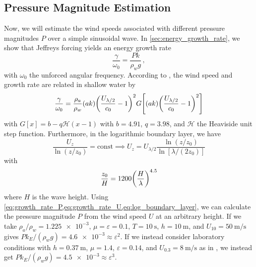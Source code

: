 \documentclass{jfm}
\renewcommand*{\epsilon}{\varepsilon}
\begin{document}
\subsection{\label{sec:press_mag} Pressure Magnitude Estimation}
Now, we will estimate the wind speeds associated with different pressure
magnitudes $P$ over a simple sinusoidal wave.
In \cref{sec:energy_growth_rate}, we show that Jeffreys forcing yields
an energy growth rate
\begin{equation}
  \frac{\gamma}{\omega_0} = \frac{P k}{\rho_w g} \,,
  \label{eq:growth_rate_P}
\end{equation}
with $\omega_0$ the unforced angular frequency.
According to \citet{donelan2006wave}, the wind speed and growth rate
are related in shallow water by
\begin{equation}
  \frac{\gamma}{\omega_0} = \frac{\rho_a}{\rho_w} (ak)
  \pqty{\frac{U_{\lambda/2}}{c_0} - 1}^2
  G \bqty{(ak)
  \pqty{\frac{U_{\lambda/2}}{c_0} - 1}^2}
  \label{eq:growth_rate_U}
\end{equation}
with $G[x] = b - q \mathcal{H}(x - 1)$ with $b = 4.91$, $q = 3.98$, and
$\mathcal{H}$ the Heaviside unit step function.
Furthermore, in the logarithmic boundary layer, we have
\begin{equation}
  \frac{U_z}{\ln(z/z_0)} = \text{const}
  \implies U_{z} = U_{\lambda/2} \frac{\ln(z/z_0)}{\ln[\lambda/(2 z_0)]}
  \label{eq:log_boundary_layer}
\end{equation}
with \citep{taylor2001dependence}
\begin{equation}
  \frac{z_0}{H} = 1200 \pqty{\frac{H}{\lambda}}^{4.5}
\end{equation}
where $H$ is the wave height.
Using \cref{eq:growth_rate_P,eq:growth_rate_U,eq:log_boundary_layer}, we
can calculate the pressure magnitude $P$ from the wind speed $U$ at an
arbitrary height.
If we take $\rho_a/\rho_w = \num{1.225e-3}$, $\mu = \epsilon = 0.1$, $T
= \SI{10}{\second}$, $h = \SI{10}{\meter}$, and $U_{10} =
\SI{50}{\meter\per\second}$ gives $P k_E/(\rho_w g) = \num{4.6e-3} \approx
\epsilon^2$.
If we instead consider laboratory conditions with $h=\SI{0.37}{\meter}$,
$\mu = 1.4$, $\epsilon = 0.14$, and $U_{0.3} = \SI{8}{\meter\per\second}$
as in \citet{feddersen2005wind}, we instead get $P k_E/(\rho_w g) =
\num{4.5e-3} \approx \epsilon^3$.
\end{document}
